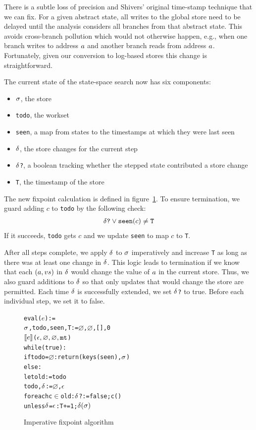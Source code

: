 \documentclass[preprint,onecolumn,9pt]{sigplanconf} %
\begin{document}
There is a subtle loss of precision and Shivers' original time-stamp
technique that we can fix. For a given abstract state, all writes to
the global store need to be delayed until the analysis considers all
branches from that abstract state. This avoids cross-branch pollution
which would not otherwise happen, e.g., when one branch writes to
address $a$ and another branch reads from address
$a$. Fortunately, given our conversion to log-based stores this
change is straightforward.


The current state of the state-space search now has six components:

\begin{itemize}
 \item{{\tt $\sigma$}, the store}
 \item{{\tt todo}, the workset}
 \item{{\tt seen}, a map from states to the timestamps at which they were last seen}
 \item{{\tt $\delta$}, the store changes for the current step}
 \item{{\tt $\delta$?}, a boolean tracking whether the stepped state contributed a store change}
 \item{{\tt T}, the timestamp of the store}
\end{itemize}

The new fixpoint calculation is defined in
figure~\ref{fig:imperative}.  To ensure termination, we guard adding
$c$ to {\tt todo} by the following check:
\begin{align*}\delta\mbox{{\tt ?}} \vee {\tt seen}(c) \neq {\tt T}\end{align*}
If it succeeds, {\tt todo} gets $c$ and we update {\tt seen} to map $c$ to {\tt T}.

After all steps complete, we apply $\delta$ to $\sigma$ imperatively and increase
{\tt T} as long as there was at least one change in $\delta$. This
logic leads to termination if we know that each $(a, v{s})$
in $\delta$ would change the value of $a$ in the current
store. Thus, we also guard additions to $\delta$ so that only updates
that would change the store are permitted. Each time $\delta$ is
successfully extended, we set {\tt $\delta$?} to true. Before each
individual step, we set it to false.

\begin{figure}
\begin{alltt}
eval(\(e\)) :=
  \(\msto\), todo, seen, T := \(\varnothing\), \(\varnothing\), [], 0
  \(\compile{e}\)(\(\mtcntr, \varnothing, \varnothing, \kmt\))
  while(true):
    if todo = \(\varnothing\): return (keys(seen), \(\msto\))
    else:
      let old := todo
      todo, \(\msdiff\) := \(\varnothing\), \(\mtlst\)
      foreach c \(\in\) old: \(\msdiff\)? := false; c()
      unless \(\msdiff\) = \(\mtlst\): T += 1; \(\msdiff(\msto)\)
\end{alltt}
\caption{Imperative fixpoint algorithm}
\label{fig:imperative}
\end{figure}
\end{document}
